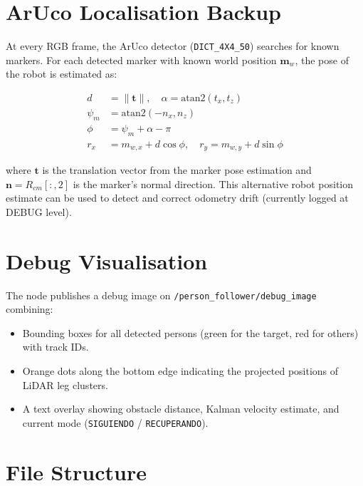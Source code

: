 \documentclass[12pt,a4paper]{article}
\begin{document}
\section{ArUco Localisation Backup}

At every RGB frame, the ArUco detector (\texttt{DICT\_4X4\_50}) searches for
known markers.  For each detected marker with known world position
$\mathbf{m}_w$, the pose of the robot is estimated as:

\begin{align}
  d       &= \|\mathbf{t}\|,\quad
  \alpha  = \text{atan2}(t_x, t_z) \\
  \psi_m  &= \text{atan2}(-n_x, n_z) \\
  \phi    &= \psi_m + \alpha - \pi \\
  r_x     &= m_{w,x} + d\cos\phi, \quad r_y = m_{w,y} + d\sin\phi
\end{align}

where $\mathbf{t}$ is the translation vector from the marker pose estimation
and $\mathbf{n} = R_{cm}[:,2]$ is the marker's normal direction.  This
alternative robot position estimate can be used to detect and correct odometry
drift (currently logged at DEBUG level).

\section{Debug Visualisation}

The node publishes a debug image on
\texttt{/person\_\allowbreak follower/\allowbreak debug\_image} combining:
\begin{itemize}
  \item Bounding boxes for all detected persons (green for the target,
    red for others) with track IDs.
  \item Orange dots along the bottom edge indicating the projected
    positions of LiDAR leg clusters.
  \item A text overlay showing obstacle distance, Kalman velocity estimate,
    and current mode (\texttt{SIGUIENDO} / \texttt{RECUPERANDO}).
\end{itemize}

\section{File Structure}
\end{document}
